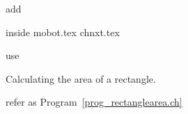 add
\usepackage{program_article}
inside mobot.tex chnxt.tex


use
\begin{Program}
{\small}
\caption{Calculating the area of a rectangle.}
\label{prog_rectanglearea.ch}
\end{Program}

refer as
Program~\ref{prog_rectanglearea.ch}


